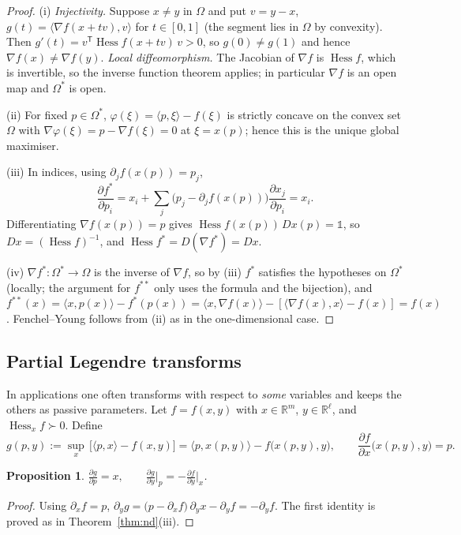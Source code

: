 \documentclass[11pt,a4paper]{article}
\newcommand{\R}{\mathbb{R}}
\newcommand{\ip}[2]{\langle #1,#2\rangle}
\newcommand{\pder}[2]{\frac{\partial #1}{\partial #2}}
\DeclareMathOperator{\Hess}{Hess}
\theoremstyle{plain}
\newtheorem{proposition}[theorem]{Proposition}
\theoremstyle{definition}
\theoremstyle{remark}
\begin{document}
\begin{proof}
(i) \emph{Injectivity.} Suppose $x\neq y$ in $\Omega$ and put $v=y-x$,
$g(t)=\ip{\nabla f(x+tv)}{v}$ for $t\in[0,1]$ (the segment lies in $\Omega$ by
convexity).  Then $g'(t)=v^{\mathsf T}\Hess f(x+tv)\,v>0$, so
$g(0)\neq g(1)$ and hence $\nabla f(x)\neq\nabla f(y)$.  \emph{Local
diffeomorphism.} The Jacobian of $\nabla f$ is $\Hess f$, which is
invertible, so the inverse function theorem applies; in particular $\nabla f$
is an open map and $\Omega^*$ is open.

(ii) For fixed $p\in\Omega^*$, $\varphi(\xi)=\ip{p}{\xi}-f(\xi)$ is strictly
concave on the convex set $\Omega$ with $\nabla\varphi(\xi)=p-\nabla f(\xi)=0$ at
$\xi=x(p)$; hence this is the unique global maximiser.

(iii) In indices, using $\partial_jf(x(p))=p_j$,
\[
  \pder{f^*}{p_i}=x_i+\sum_j\bigl(p_j-\partial_jf(x(p))\bigr)\pder{x_j}{p_i}=x_i .
\]
Differentiating $\nabla f(x(p))=p$ gives
$\Hess f(x(p))\,Dx(p)=\mathbb 1$, so $Dx=(\Hess f)^{-1}$, and
$\Hess f^*=D(\nabla f^*)=Dx$.

(iv) $\nabla f^*\colon\Omega^*\to\Omega$ is the inverse of $\nabla f$, so
by (iii) $f^*$ satisfies the hypotheses on $\Omega^*$ (locally; the argument
for $f^{**}$ only uses the formula and the bijection), and
$f^{**}(x)=\ip{x}{p(x)}-f^*(p(x))=\ip{x}{\nabla f(x)}-[\ip{\nabla f(x)}{x}-f(x)]=f(x)$.
Fenchel--Young follows from (ii) as in the one-dimensional case.
\end{proof}

\subsection{Partial Legendre transforms}

In applications one often transforms with respect to \emph{some} variables
and keeps the others as passive parameters.  Let $f=f(x,y)$ with
$x\in\R^m$, $y\in\R^\ell$, and $\Hess_xf\succ0$.  Define
\[
  g(p,y):=\sup_{x}\,\bigl[\ip{p}{x}-f(x,y)\bigr]=\ip{p}{x(p,y)}-f\bigl(x(p,y),y\bigr),
  \qquad \pder{f}{x}\bigl(x(p,y),y\bigr)=p .
\]

\begin{proposition}\label{prop:partial}
$\displaystyle \pder{g}{p}=x,\qquad
 \pder{g}{y}\bigg|_{p}=-\pder{f}{y}\bigg|_{x}$.
\end{proposition}

\begin{proof}
Using $\partial_xf=p$,
$\partial_yg=\bigl(p-\partial_xf\bigr)\,\partial_yx-\partial_yf=-\partial_yf$.
The first identity is proved as in Theorem~\ref{thm:nd}(iii).
\end{proof}
\end{document}
